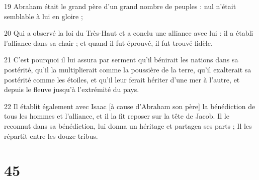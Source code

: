 \par 19 Abraham était le grand père d'un grand nombre de peuples : nul n'était semblable à lui en gloire ;
\par 20 Qui a observé la loi du Très-Haut et a conclu une alliance avec lui : il a établi l'alliance dans sa chair ; et quand il fut éprouvé, il fut trouvé fidèle.
\par 21 C'est pourquoi il lui assura par serment qu'il bénirait les nations dans sa postérité, qu'il la multiplierait comme la poussière de la terre, qu'il exalterait sa postérité comme les étoiles, et qu'il leur ferait hériter d'une mer à l'autre, et depuis le fleuve jusqu'à l'extrémité du pays.
\par 22 Il établit également avec Isaac [à cause d'Abraham son père] la bénédiction de tous les hommes et l'alliance, et il la fit reposer sur la tête de Jacob. Il le reconnut dans sa bénédiction, lui donna un héritage et partagea ses parts ; Il les répartit entre les douze tribus.

\chapter{45}

